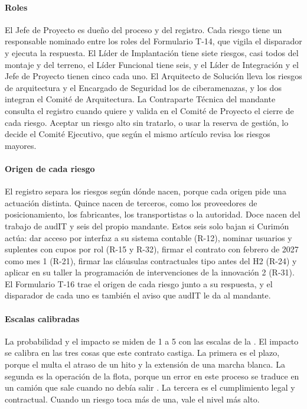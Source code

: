 \paragraph{Roles}
El Jefe de Proyecto es dueño del proceso y del registro. Cada riesgo tiene un responsable nominado entre
los roles del Formulario T-14, que vigila el disparador y ejecuta la respuesta. El Líder de Implantación
tiene siete riesgos, casi todos del montaje y del terreno, el Líder Funcional tiene seis, y el Líder de
Integración y el Jefe de Proyecto tienen cinco cada uno. El Arquitecto de Solución lleva los riesgos de arquitectura
y el Encargado de Seguridad los de ciberamenazas, y los dos integran el Comité de Arquitectura. La
Contraparte Técnica del mandante consulta el registro cuando quiere y valida en el Comité de Proyecto el
cierre de cada riesgo. Aceptar un riesgo alto sin tratarlo, o usar la reserva de gestión, lo decide el
Comité Ejecutivo, que según el mismo artículo revisa los riesgos mayores.

\paragraph{Origen de cada riesgo}
El registro separa los riesgos según dónde nacen, porque cada origen pide una actuación distinta.
Quince nacen de terceros, como los proveedores de posicionamiento, los fabricantes, los transportistas o
la autoridad. Doce nacen del trabajo de audIT y seis del propio mandante. Estos seis solo bajan si
Curimón actúa: dar acceso por interfaz a su sistema contable (R-12), nominar usuarios y suplentes con
cupos por rol (R-15 y R-32), firmar el contrato con febrero de 2027 como mes 1 (R-21), firmar las
cláusulas contractuales tipo antes del H2 (R-24) y aplicar en su taller la programación de
intervenciones de la innovación 2 (R-31). El Formulario T-16 trae el origen de cada riesgo junto a su
respuesta, y el disparador de cada uno es también el aviso que audIT le da al mandante.

\paragraph{Escalas calibradas}
La probabilidad y el impacto se miden de 1 a 5 con las escalas de la . El impacto se
calibra en las tres cosas que este contrato castiga. La primera es el plazo, porque el  multa
el atraso de un hito y la extensión de una marcha blanca. La segunda es la operación de la flota, porque
un error en este proceso se traduce en un camión que sale cuando no debía salir
. La tercera es el cumplimiento legal y contractual. Cuando un riesgo toca más de
una, vale el nivel más alto.

